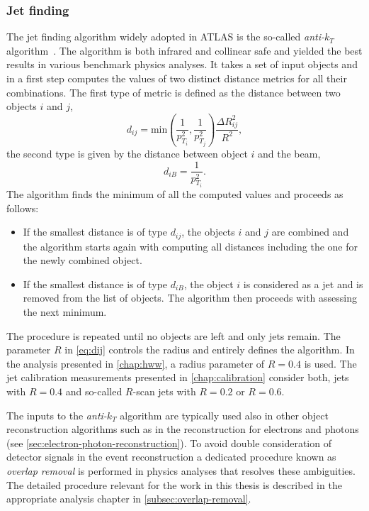\subsubsection{Jet finding}
The jet finding algorithm widely adopted in ATLAS is the so-called \emph{anti-$k_T$} algorithm~\cite{Cacciari:2008gp}. The algorithm is both infrared and collinear safe and yielded the best results in various benchmark physics analyses. 
It takes a set of input objects and in a first step computes the values of two distinct distance metrics for all their combinations.
The first type of metric is defined as the distance between two objects $i$ and $j$, 
\begin{equation}
    d_{ij} = \text{min}\left(\frac{1}{p_{T_i}^2},\frac{1}{p_{T_j}^2}\right) \frac{\Delta R_{ij}^2}{R^2},
    \label{eq:dij}
\end{equation}
the second type is given by the distance between object $i$ and the beam, 
    \begin{equation}
        d_{iB} = \frac{1}{p_{T_i}^2}.
\end{equation}
The algorithm finds the minimum of all the computed values and proceeds as follows:
\begin{itemize}
    \item If the smallest distance is of type $d_{ij}$, the objects $i$ and $j$ are combined and the algorithm starts again with computing all distances including the one for the newly combined object.
    \item If the smallest distance is of type $d_{iB}$, the object $i$ is considered as a jet and is removed from the list of objects. The algorithm then proceeds with assessing the next minimum.
\end{itemize}
The procedure is repeated until no objects are left and only jets remain. 
The parameter $R$ in \cref{eq:dij} controls the radius and entirely defines the algorithm. 
In the \HWW analysis presented in \cref{chap:hww}, a radius parameter of $R = 0.4$ is used. The jet calibration measurements presented in \cref{chap:calibration} consider both, jets with $R = 0.4$ and so-called $R$-scan jets with $R = 0.2$ or $R = 0.6$.

The inputs to the \emph{anti-$k_T$} algorithm are typically used also in other object reconstruction algorithms such as in the reconstruction for electrons and photons (see \cref{sec:electron-photon-reconstruction}). 
To avoid double consideration of detector signals in the event reconstruction a dedicated procedure known as \emph{overlap removal} is performed in physics analyses that resolves these ambiguities. The detailed procedure relevant for the work in this thesis is described in the appropriate analysis chapter in \cref{subsec:overlap-removal}.


